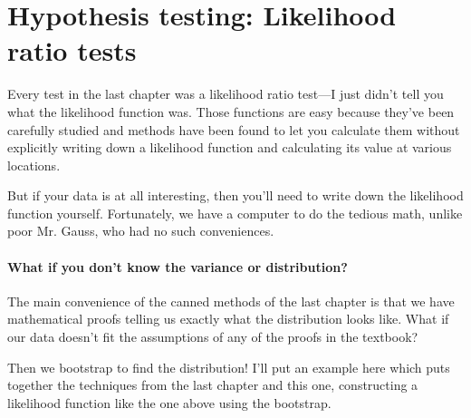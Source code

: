 \section{Hypothesis testing: Likelihood ratio tests} Every test
in the last chapter was a likelihood ratio test---I just didn't tell
you what the likelihood function was. Those functions are easy because
they've been carefully studied and methods have been found to let you
calculate them without explicitly writing down a likelihood function
and calculating its value at various locations.

But if your data is at all interesting, then you'll need to write down
the likelihood function yourself.  Fortunately, we have a computer to
do the tedious math, unlike poor Mr. Gauss, who had no such conveniences.


\paragraph{What if you don't know the variance or distribution?} The main convenience of the canned methods of the last
chapter is that we have mathematical proofs telling us exactly what the distribution looks like. What if
our data doesn't fit the assumptions of any of the proofs in the textbook?

Then we bootstrap to find the distribution! I'll put an example here which puts together the techniques
from the last chapter and this one, constructing a likelihood function like the one above using the
bootstrap.

